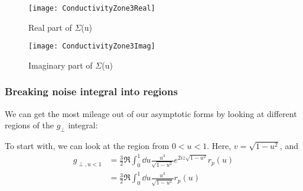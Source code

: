 \documentclass[../main.tex]{subfiles}
\begin{document}
	\begin{figure}[htp]
		\centering
		\texttt{[image: ConductivityZone3Real]}
		\caption{Real part of $\Sigma$(u)} \label{fig:ConductivityRe}
	\end{figure}

	\begin{figure}[htp]
		\centering
		\texttt{[image: ConductivityZone3Imag]}
		\caption{Imaginary part of $\Sigma$(u)} \label{fig:ConductivityIm}
	\end{figure}

	\subsubsection{Breaking noise integral into regions} \label{subsubsec:noiseregions}
	We can get the most mileage out of our asymptotic forms by looking at different regions of the $g_\perp$ integral:

	To start with, we can look at the region from $0 < u < 1$.
	Here, $v = \sqrt{1 - u^2}$, and
	\begin{align}
		g_{\perp, u < 1} &= \frac32 \Re \int_0^{1} \dd{u} \frac{u^3}{\sqrt{1 - u^2}} e^{2 i z \sqrt{1 - u^2}} r_p(u) \\
			&= \frac32 \Re \int_0^{1} \dd{u} \frac{u^3}{\sqrt{1 - u^2}} r_p(u)
	\end{align}
\end{document}
